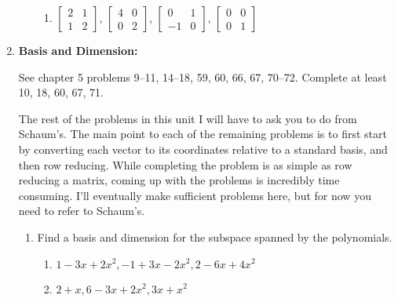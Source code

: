 \begin{enumerate}
\begin{enumerate}
\begin{multicols}{2}
\begin{enumerate}
\item 
$\begin{bmatrix}
 2 & 1 \\
 1 & 2
\end{bmatrix}$,
$\begin{bmatrix}
 4 & 0 \\
 0 & 2
\end{bmatrix}$,
$\begin{bmatrix}
 0 & 1 \\
 -1 & 0
\end{bmatrix}$,
$\begin{bmatrix}
 0 & 0 \\
 0 & 1
\end{bmatrix}$

		\end{enumerate}
\end{multicols}
\end{enumerate}















\item \textbf{Basis and Dimension:} 

See chapter 5 problems 9--11, 14--18, 59, 60, 66, 67, 70--72. 
Complete at least 10, 18, 60, 67, 71.

The rest of the problems in this unit I will have to ask you to do from Schaum's.  The main point to each of the remaining problems is to first start by converting each vector to its coordinates relative to a standard basis, and then row reducing.  While completing the problem is as simple as row reducing a matrix, coming up with the problems is incredibly time consuming. I'll eventually make sufficient problems here, but for now you need to refer to Schaum's.

\begin{enumerate}

	\item Find a basis and dimension for the subspace spanned by the polynomials.
		\begin{enumerate}
			\item $1-3x+2x^2, -1+3x-2x^2, 2-6x+4x^2$
			\item $2+x, 6-3x+2x^2, 3x+x^2$
		\end{enumerate}


\end{enumerate}
\end{enumerate}
